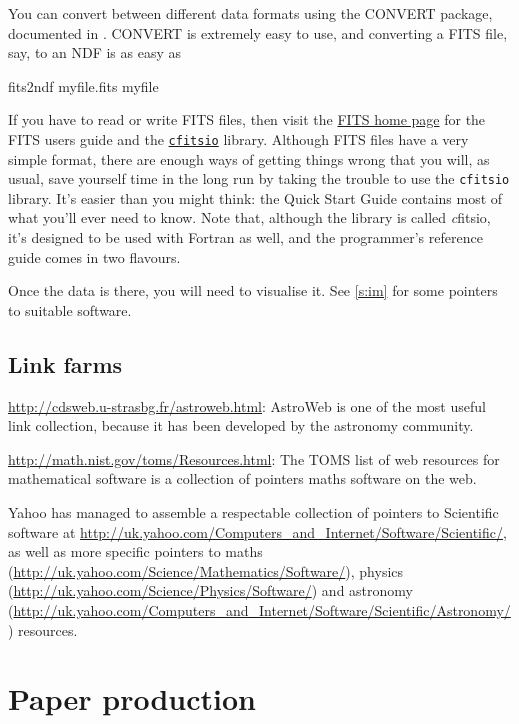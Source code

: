 \documentclass[11pt,oneside,chapters]{starlink}
\begin{document}
You can convert between different data formats using the
CONVERT package, documented in .
CONVERT is extremely easy to use, and
converting a FITS file, say, to an NDF is as easy as

\begin{terminalv}
fits2ndf myfile.fits myfile
\end{terminalv}

If you have to read or write FITS files, then visit the
\href{http://fits.gsfc.nasa.gov/}{FITS home page}
for the FITS users guide and the
\href{http://heasarc.gsfc.nasa.gov/docs/software/fitsio/fitsio.html}{\texttt{cfitsio}}
library.  Although FITS files have a very simple format,
there are enough ways of getting things wrong that you
will, as usual, save yourself time in the long run by
taking the trouble to use the \texttt{cfitsio}
library.  It's easier than you might think: the Quick
Start Guide contains most of what you'll ever need to
know.  Note that, although the library is called
\emph{c}fitsio, it's designed to be used with Fortran as
well, and the programmer's reference guide comes in two
flavours.

Once the data is there, you will need to visualise it.  See
\ref{s:im} for some pointers to suitable
software.

\section{Link farms}
\label{s:link:libs}

\url{http://cdsweb.u-strasbg.fr/astroweb.html}:
AstroWeb is one of the most useful link collection, because
it has been developed by the astronomy community.

\url{http://math.nist.gov/toms/Resources.html}: The
TOMS list of web resources for mathematical software is a
collection of pointers maths software on the web.

Yahoo has managed to assemble a respectable collection of
pointers to Scientific software at
\url{http://uk.yahoo.com/Computers_and_Internet/Software/Scientific/},
as well as more specific pointers to maths
(\url{http://uk.yahoo.com/Science/Mathematics/Software/}),
physics
(\url{http://uk.yahoo.com/Science/Physics/Software/})
and astronomy
(\url{http://uk.yahoo.com/Computers_and_Internet/Software/Scientific/Astronomy/})
resources.

\chapter{Paper production}
\label{s:paper}
\end{document}
